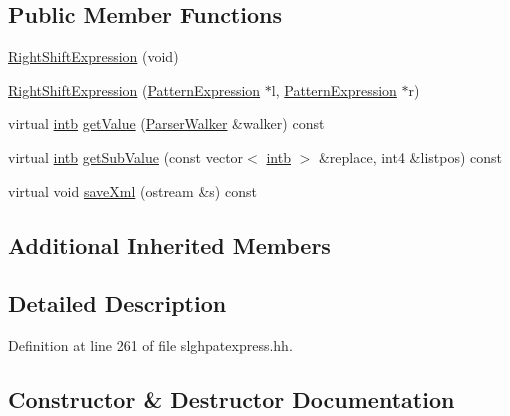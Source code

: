 \subsection*{Public Member Functions}
\begin{DoxyCompactItemize}
\item 
\mbox{\hyperlink{class_right_shift_expression_a2ff7b5199adfc4e5846d548c2bb1cd78}{Right\+Shift\+Expression}} (void)
\item 
\mbox{\hyperlink{class_right_shift_expression_ab56635d4e261a1e50ef8b1accbbca80e}{Right\+Shift\+Expression}} (\mbox{\hyperlink{class_pattern_expression}{Pattern\+Expression}} $\ast$l, \mbox{\hyperlink{class_pattern_expression}{Pattern\+Expression}} $\ast$r)
\item 
virtual \mbox{\hyperlink{types_8h_aa925ba3e627c2df89d5b1cfe84fb8572}{intb}} \mbox{\hyperlink{class_right_shift_expression_af14326c4721f55d083ee08d911b4ffab}{get\+Value}} (\mbox{\hyperlink{class_parser_walker}{Parser\+Walker}} \&walker) const
\item 
virtual \mbox{\hyperlink{types_8h_aa925ba3e627c2df89d5b1cfe84fb8572}{intb}} \mbox{\hyperlink{class_right_shift_expression_a4b2484ca5edaa72d1afaf11a61ce1389}{get\+Sub\+Value}} (const vector$<$ \mbox{\hyperlink{types_8h_aa925ba3e627c2df89d5b1cfe84fb8572}{intb}} $>$ \&replace, int4 \&listpos) const
\item 
virtual void \mbox{\hyperlink{class_right_shift_expression_ac5b992fab5ad4df326b2ae9647496828}{save\+Xml}} (ostream \&s) const
\end{DoxyCompactItemize}
\subsection*{Additional Inherited Members}


\subsection{Detailed Description}


Definition at line 261 of file slghpatexpress.\+hh.



\subsection{Constructor \& Destructor Documentation}
\mbox{\label{class_right_shift_expression_a2ff7b5199adfc4e5846d548c2bb1cd78}} 
